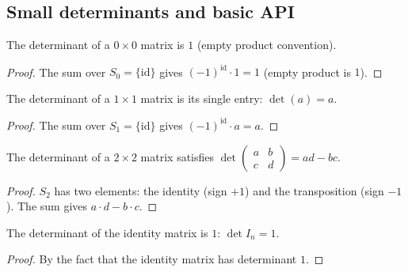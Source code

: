 \subsection{Small determinants and basic API}

\begin{lemma}
\label{lem.det.fin-zero}
\leanhelper
\leanok
The determinant of a $0 \times 0$ matrix is $1$ (empty product convention).
\end{lemma}

\begin{proof}
\leanok
The sum over $S_0 = \{\mathrm{id}\}$ gives $(-1)^{\mathrm{id}} \cdot 1 = 1$
(empty product is $1$).
\end{proof}

\begin{lemma}
\label{lem.det.fin-one}
\leanhelper
\leanok
The determinant of a $1 \times 1$ matrix is its single entry: $\det (a) = a$.
\end{lemma}

\begin{proof}
\leanok
The sum over $S_1 = \{\mathrm{id}\}$ gives $(-1)^{\mathrm{id}} \cdot a = a$.
\end{proof}

\begin{lemma}
\label{lem.det.fin-two}
\leanhelper
\leanok
The determinant of a $2 \times 2$ matrix satisfies
$\det \begin{pmatrix} a & b \\ c & d \end{pmatrix} = ad - bc$.
\end{lemma}

\begin{proof}
\leanok
$S_2$ has two elements: the identity (sign $+1$) and the transposition (sign $-1$).
The sum gives $a \cdot d - b \cdot c$.
\end{proof}

\begin{lemma}
\label{lem.det.one-eq-one}
\leanhelper
\leanok
The determinant of the identity matrix is $1$: $\det I_n = 1$.
\end{lemma}

\begin{proof}
\leanok
By the fact that the identity matrix has determinant $1$.
\end{proof}

